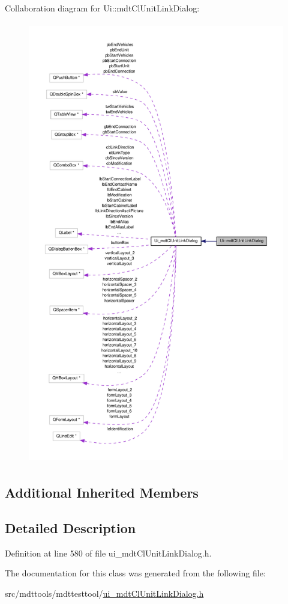 Collaboration diagram for Ui\-:\-:mdt\-Cl\-Unit\-Link\-Dialog\-:\nopagebreak
\begin{figure}[H]
\begin{center}
\leavevmode
\includegraphics[height=550pt]{class_ui_1_1mdt_cl_unit_link_dialog__coll__graph}
\end{center}
\end{figure}
\subsection*{Additional Inherited Members}


\subsection{Detailed Description}


Definition at line 580 of file ui\-\_\-mdt\-Cl\-Unit\-Link\-Dialog.\-h.



The documentation for this class was generated from the following file\-:\begin{DoxyCompactItemize}
\item 
src/mdttools/mdttesttool/\hyperlink{ui__mdt_cl_unit_link_dialog_8h}{ui\-\_\-mdt\-Cl\-Unit\-Link\-Dialog.\-h}\end{DoxyCompactItemize}
